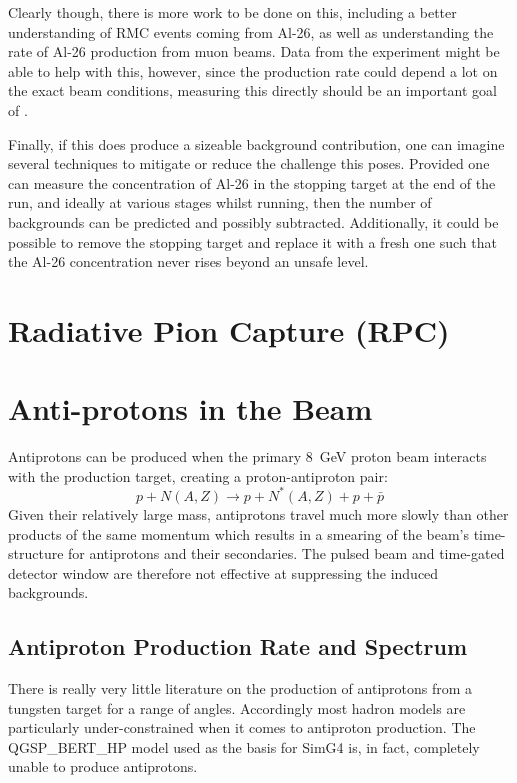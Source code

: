 Clearly though, there is more work to be done on this, including a better understanding of \ac{RMC} events coming from Al-26, as well as understanding the rate of Al-26 production from muon beams.
Data from the \alcap experiment might be able to help with this, however, since the production rate could depend a lot on the exact beam conditions, measuring this directly should be an important goal of \phaseI.

Finally, if this does produce a sizeable background contribution, one can imagine several techniques to mitigate or reduce the challenge this poses.
Provided one can measure the concentration of Al-26 in the stopping target at the end of the run, and ideally at various stages whilst running, then the number of backgrounds can be predicted and possibly subtracted.
Additionally, it could be possible to remove the stopping target and replace it with a fresh one such that the Al-26 concentration never rises beyond an unsafe level.

\section{Radiative Pion Capture (\acs{RPC})}

\section{Anti-protons in the Beam}
Antiprotons can be produced when the primary 8~GeV proton beam interacts with the production target, creating a proton-antiproton pair:
\begin{equation}
p + N(A,Z) \rightarrow p + N^*(A,Z) + p+\bar{p}
\end{equation}
Given their relatively large mass, antiprotons travel much more slowly than other products of the same momentum which results in a smearing of the beam's time-structure for antiprotons and their secondaries.
The pulsed beam and time-gated detector window are therefore not effective at suppressing the induced backgrounds.

\subsection{Antiproton Production Rate and Spectrum}
There is really very little literature on the production of antiprotons from a tungsten target for a range of angles.
Accordingly most hadron models are particularly under-constrained when it comes to antiproton production.
The QGSP_BERT_HP model used as the basis for SimG4 is, in fact, completely unable to produce antiprotons.

